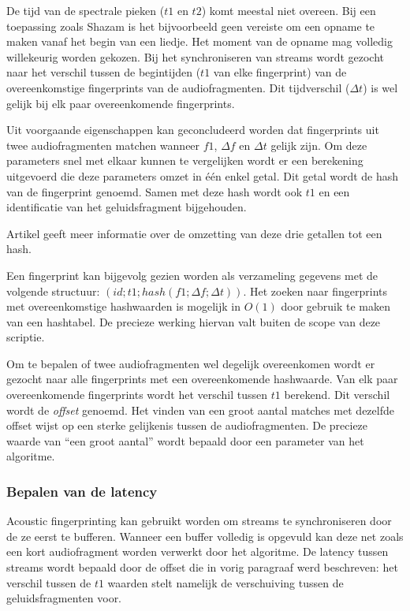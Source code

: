 De tijd van de spectrale pieken ($t1$ en $t2$) komt meestal niet overeen. Bij een toepassing zoals Shazam is het bijvoorbeeld geen vereiste om een opname te maken vanaf het begin van een liedje. Het moment van de opname mag volledig willekeurig worden gekozen. Bij het synchroniseren van streams wordt gezocht naar het verschil tussen de begintijden ($t1$ van elke fingerprint) van de overeenkomstige fingerprints van de audiofragmenten. Dit tijdverschil ($\Delta t$) is wel gelijk bij elk paar overeenkomende fingerprints.

Uit voorgaande eigenschappen kan geconcludeerd worden dat fingerprints uit twee audiofragmenten matchen wanneer $ f1 $, $ \Delta f $ en $ \Delta t $ gelijk zijn. Om deze parameters snel met elkaar kunnen te vergelijken wordt er een berekening uitgevoerd die deze parameters omzet in één enkel getal. Dit getal wordt de hash van de fingerprint genoemd. Samen met deze hash wordt ook $ t1 $ en een identificatie van het geluidsfragment bijgehouden.

Artikel \cite{six2014panako} geeft meer informatie over de omzetting van deze drie getallen tot een hash.

Een fingerprint kan bijgevolg gezien worden als verzameling gegevens met de volgende structuur: $ ( id; t1; hash(f1; \Delta f; \Delta t) ) $. Het zoeken naar fingerprints met overeenkomstige hashwaarden is mogelijk in $O(1)$ door gebruik te maken van een hashtabel. De precieze werking hiervan valt buiten de scope van deze scriptie.

Om te bepalen of twee audiofragmenten wel degelijk overeenkomen wordt er gezocht naar alle fingerprints met een overeenkomende hashwaarde. Van elk paar overeenkomende fingerprints wordt het verschil tussen $ t1 $ berekend. Dit verschil wordt de \textit{offset} genoemd. Het vinden van een groot aantal matches met dezelfde offset wijst op een sterke gelijkenis tussen de audiofragmenten. De precieze waarde van ``een groot aantal'' wordt bepaald door een parameter van het algoritme.

\subsubsection{Bepalen van de latency}

Acoustic fingerprinting kan gebruikt worden om streams te synchroniseren door de ze eerst te bufferen. Wanneer een buffer volledig is opgevuld kan deze net zoals een kort audiofragment worden verwerkt door het algoritme. De latency tussen streams wordt bepaald door de offset die in vorig paragraaf werd beschreven: het verschil tussen de $ t1 $ waarden stelt namelijk de verschuiving tussen de geluidsfragmenten voor.

